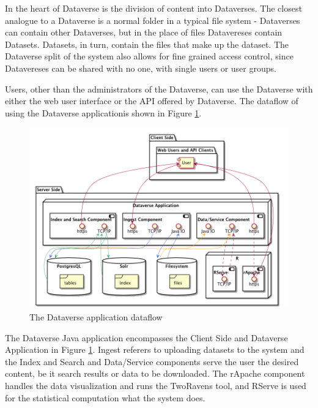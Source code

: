 In the heart of Dataverse is the division of content into Dataverses. The
closest analogue to a Dataverse is a normal folder in a typical file system -
Dataverses can contain other Dataverses, but in the place of files Datavereses
contain Datasets. Datasets, in turn, contain the files that make up the
dataset. The Dataverse split of the system also allows for fine grained access
control, since Datavereses can be shared with no one, with single users or user
groups.

Users, other than the administrators of the Dataverse, can use the Dataverse
with either the web user interface or the API offered by Dataverse. The
dataflow of using the Dataverse application is shown in Figure
\ref{fig:dataflow}.

\begin{figure}
    \begin{centering}
        \includegraphics[width=\textwidth]{images/dataflow}
    \end{centering}
    \caption[The Dataverse application dataflow]{The Dataverse application dataflow}
    \label{fig:dataflow}
\end{figure}

The Dataverse Java application encompasses the Client Side and Dataverse
Application in Figure \ref{fig:dataflow}. Ingest referers to uploading datasets
to the system and the Index and Search and Data/Service components serve the
user the desired content, be it search results or data to be downloaded. The
rApache component handles the data visualization and runs the TwoRavens tool,
and RServe is used for the statistical computation what the system does.

